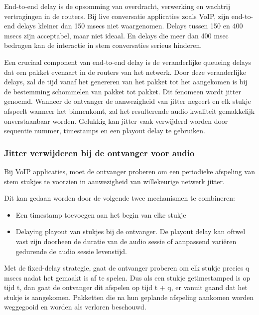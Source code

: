 
\noindent End-to-end delay is de opsomming van overdracht, verwerking en wachtrij vertragingen in de routers. Bij live conversatie applicaties zoals VoIP, zijn end-to-end delays kleiner dan 150 msecs niet waargenomen. Delays tussen 150 en 400 msecs zijn acceptabel, maar niet ideaal. En delays die meer dan 400 msec bedragen kan de interactie in stem conversaties serieus hinderen.


\noindent Een cruciaal component van end-to-end delay is de veranderlijke queueing delays dat een pakket evenaart in de routers van het netwerk. Door deze veranderlijke delays, zal de tijd vanaf het genereren van het pakket tot het aangekomen is bij de bestemming schommelen van pakket tot pakket. Dit fenomeen wordt jitter genoemd. Wanneer de ontvanger de aanwezigheid van jitter negeert en elk stukje afspeelt wanneer het binnenkomt, zal het resulterende audio kwaliteit gemakkelijk onverstaanbaar worden. Gelukkig kan jitter vaak verwijderd worden door sequentie nummer, timestamps en een playout delay te gebruiken.

\subsubsection{Jitter verwijderen bij de ontvanger voor audio}

\noindent Bij VoIP applicaties, moet de ontvanger proberen om een periodieke afspeling van stem stukjes te voorzien in aanwezigheid van willekeurige netwerk jitter. 

\noindent Dit kan gedaan worden door de volgende twee mechanismen te combineren:
\begin{itemize}
\item Een timestamp toevoegen aan het begin van elke stukje
\item Delaying playout van stukjes bij de ontvanger. De playout delay kan oftwel vast zijn doorheen de duratie van de audio sessie of aanpassend variëren gedurende de audio sessie levenstijd.
\end{itemize}


\noindent Met de fixed-delay strategie, gaat de ontvanger proberen om elk stukje precies q msecs nadat het gemaakt is af te spelen. Dus als een stukje getimestamped is op tijd t, dan gaat de ontvanger dit afspelen op tijd t + q, er vanuit gaand dat het stukje is aangekomen. Pakketten die na hun geplande afspeling aankomen worden weggegooid en worden als verloren beschouwd.

